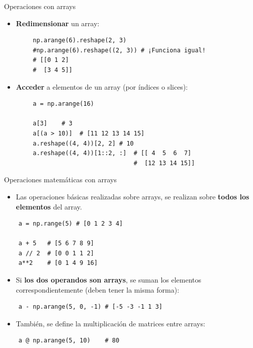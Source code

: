 \documentclass[10pt]{beamer} %
\begin{document}
\begin{frame}[fragile]{Operaciones con arrays}
    \begin{itemize}
        \item \textbf{Redimensionar} un array:
    \end{itemize}
    \begin{verbatim}
        np.arange(6).reshape(2, 3)
        #np.arange(6).reshape((2, 3)) # ¡Funciona igual!
        # [[0 1 2]
        #  [3 4 5]]
    \end{verbatim}
    \begin{itemize}
        \item \textbf{Acceder} a elementos de un array (por índices o slices):
    \end{itemize}
    \begin{verbatim}
        a = np.arange(16)
        
        a[3]    # 3
        a[(a > 10)]  # [11 12 13 14 15]
        a.reshape((4, 4))[2, 2] # 10
        a.reshape((4, 4))[1::2, :]  # [[ 4  5  6  7]
                                    #  [12 13 14 15]]
    \end{verbatim}
\end{frame}

\begin{frame}[fragile]{Operaciones matemáticas con arrays}
\begin{itemize}
    \item Las operaciones básicas realizadas sobre arrays, se realizan sobre \textbf{todos los elementos} del array.
\end{itemize}
\begin{verbatim}
    a = np.range(5) # [0 1 2 3 4]
    
    a + 5   # [5 6 7 8 9]
    a // 2  # [0 0 1 1 2]
    a**2    # [0 1 4 9 16]
\end{verbatim}
\begin{itemize}
    \item Si \textbf{los dos operandos son arrays}, se suman los elementos correspondientemente (deben tener la misma forma):
\end{itemize}
\begin{verbatim}
    a - np.arange(5, 0, -1) # [-5 -3 -1 1 3]
\end{verbatim}
\begin{itemize}
    \item También, se define la multiplicación de matrices entre arrays:
\end{itemize}
\begin{verbatim}
    a @ np.arange(5, 10)    # 80
\end{verbatim}
\end{frame}
\end{document}

